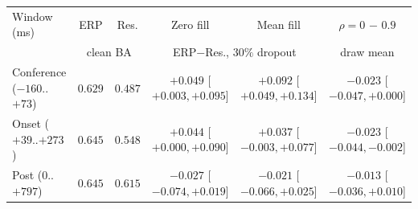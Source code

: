 \begin{tabular}{lccccc}
\toprule
Window (ms) & ERP & Res. & Zero fill & Mean fill & $\rho{=}0$ $-$ $0.9$ \\ & \multicolumn{2}{c}{clean BA} & \multicolumn{2}{c}{ERP$-$Res., $30\%$ dropout} & draw mean \\
\midrule
Conference ($-160$..$+73$) & $0.629$ & $0.487$ & $+0.049$ [$+0.003,+0.095$] & $+0.092$ [$+0.049,+0.134$] & $-0.023$ [$-0.047,+0.000$] \\
Onset ($+39$..$+273$) & $0.645$ & $0.548$ & $+0.044$ [$+0.000,+0.090$] & $+0.037$ [$-0.003,+0.077$] & $-0.023$ [$-0.044,-0.002$] \\
Post ($0$..$+797$) & $0.645$ & $0.615$ & $-0.027$ [$-0.074,+0.019$] & $-0.021$ [$-0.066,+0.025$] & $-0.013$ [$-0.036,+0.010$] \\
\bottomrule
\end{tabular}
